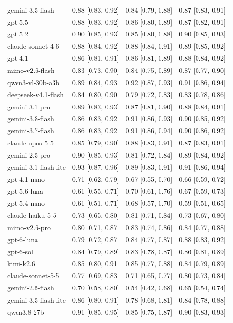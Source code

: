\begin{table}
\begin{tabular}{llll}
gemini-3.5-flash & 0.88 [0.83, 0.92] & 0.84 [0.79, 0.88] & 0.87 [0.83, 0.91] \\
gpt-5.5 & 0.88 [0.83, 0.92] & 0.86 [0.80, 0.89] & 0.87 [0.82, 0.91] \\
gpt-5.2 & 0.90 [0.85, 0.93] & 0.85 [0.80, 0.88] & 0.90 [0.85, 0.93] \\
claude-sonnet-4-6 & 0.88 [0.84, 0.92] & 0.88 [0.84, 0.91] & 0.89 [0.85, 0.92] \\
gpt-4.1 & 0.86 [0.81, 0.91] & 0.86 [0.81, 0.89] & 0.88 [0.84, 0.92] \\
mimo-v2.6-flash & 0.83 [0.73, 0.90] & 0.84 [0.75, 0.89] & 0.87 [0.77, 0.90] \\
qwen3-vl-30b-a3b & 0.89 [0.84, 0.93] & 0.92 [0.87, 0.93] & 0.91 [0.86, 0.94] \\
deepseek-v4.1-flash & 0.84 [0.80, 0.90] & 0.79 [0.72, 0.83] & 0.83 [0.78, 0.86] \\
gemini-3.1-pro & 0.89 [0.83, 0.93] & 0.87 [0.81, 0.90] & 0.88 [0.84, 0.91] \\
gemini-3.8-flash & 0.86 [0.83, 0.92] & 0.91 [0.86, 0.93] & 0.90 [0.85, 0.92] \\
gemini-3.7-flash & 0.86 [0.83, 0.92] & 0.91 [0.86, 0.94] & 0.90 [0.86, 0.92] \\
claude-opus-5-5 & 0.85 [0.79, 0.90] & 0.88 [0.83, 0.91] & 0.87 [0.83, 0.91] \\
gemini-2.5-pro & 0.90 [0.85, 0.93] & 0.81 [0.72, 0.84] & 0.89 [0.84, 0.92] \\
gemini-3.1-flash-lite & 0.93 [0.87, 0.96] & 0.89 [0.83, 0.91] & 0.91 [0.86, 0.94] \\
gpt-4.1-nano & 0.71 [0.62, 0.79] & 0.67 [0.55, 0.70] & 0.66 [0.59, 0.72] \\
gpt-5.6-luna & 0.61 [0.55, 0.71] & 0.70 [0.61, 0.76] & 0.67 [0.59, 0.73] \\
gpt-5.4-nano & 0.61 [0.51, 0.71] & 0.68 [0.57, 0.70] & 0.59 [0.51, 0.65] \\
claude-haiku-5-5 & 0.73 [0.65, 0.80] & 0.81 [0.71, 0.84] & 0.73 [0.67, 0.80] \\
mimo-v2.6-pro & 0.80 [0.71, 0.87] & 0.83 [0.74, 0.86] & 0.84 [0.77, 0.88] \\
gpt-6-luna & 0.79 [0.72, 0.87] & 0.84 [0.77, 0.87] & 0.88 [0.83, 0.92] \\
gpt-6-sol & 0.84 [0.79, 0.89] & 0.83 [0.78, 0.87] & 0.86 [0.81, 0.89] \\
kimi-k2.6 & 0.85 [0.80, 0.91] & 0.85 [0.77, 0.88] & 0.84 [0.79, 0.89] \\
claude-sonnet-5-5 & 0.77 [0.69, 0.83] & 0.71 [0.65, 0.77] & 0.80 [0.73, 0.84] \\
gemini-2.5-flash & 0.70 [0.58, 0.80] & 0.54 [0.42, 0.68] & 0.65 [0.54, 0.74] \\
gemini-3.5-flash-lite & 0.86 [0.80, 0.91] & 0.78 [0.68, 0.81] & 0.84 [0.78, 0.88] \\
qwen3.8-27b & 0.91 [0.85, 0.95] & 0.85 [0.75, 0.87] & 0.90 [0.83, 0.93] \\
\bottomrule
\end{tabular}
\end{table}
